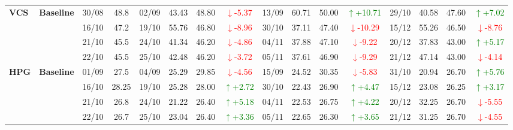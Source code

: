 \documentclass{ieeeaccess}
\begin{document}
{\begin{longtable}{llcc|cccc|cccc|cccc}
\multirow{4}{*}{\textbf{VCS}}
& \textbf{Baseline}
& 30/08 & 48.8 & 02/09 & 43.43 & 48.80 & \textcolor{red}{\(\downarrow\)-5.37} & 13/09 & 60.71 & 50.00 & \textcolor{green}{\(\uparrow\)+10.71} & 29/10 & 40.58 & 47.60 & \textcolor{green}{\(\uparrow\)+7.02} \\
& & 16/10 & 47.2 & 19/10 & 55.76 & 46.80 & \textcolor{red}{\(\downarrow\)-8.96} & 30/10 & 37.11 & 47.40 & \textcolor{red}{\(\downarrow\)-10.29} & 15/12 & 55.26 & 46.50 & \textcolor{red}{\(\downarrow\)-8.76} \\
& & 21/10 & 45.5 & 24/10 & 41.34 & 46.20 & \textcolor{red}{\(\downarrow\)-4.86} & 04/11 & 37.88 & 47.10 & \textcolor{red}{\(\downarrow\)-9.22} & 20/12 & 37.83 & 43.00 & \textcolor{green}{\(\uparrow\)+5.17} \\
& & 22/10 & 45.5 & 25/10 & 42.48 & 46.20 & \textcolor{red}{\(\downarrow\)-3.72} & 05/11 & 37.61 & 46.90 & \textcolor{red}{\(\downarrow\)-9.29} & 21/12 & 47.14 & 43.00 & \textcolor{red}{\(\downarrow\)-4.14} \\
\midrule

\multirow{4}{*}{\textbf{HPG}}
& \textbf{Baseline}
& 01/09 & 27.5 & 04/09 & 25.29 & 29.85 & \textcolor{red}{\(\downarrow\)-4.56} & 15/09 & 24.52 & 30.35 & \textcolor{red}{\(\downarrow\)-5.83} & 31/10 & 20.94 & 26.70 & \textcolor{green}{\(\uparrow\)+5.76} \\
& & 16/10 & 28.25 & 19/10 & 25.28 & 28.00 & \textcolor{green}{\(\uparrow\)+2.72} & 30/10 & 22.43 & 26.90 & \textcolor{green}{\(\uparrow\)+4.47} & 15/12 & 23.08 & 26.25 & \textcolor{green}{\(\uparrow\)+3.17} \\
& & 21/10 & 26.8 & 24/10 & 21.22 & 26.40 & \textcolor{green}{\(\uparrow\)+5.18} & 04/11 & 22.53 & 26.75 & \textcolor{green}{\(\uparrow\)+4.22} & 20/12 & 32.25 & 26.70 & \textcolor{red}{\(\downarrow\)-5.55} \\
& & 22/10 & 26.7 & 25/10 & 23.04 & 26.40 & \textcolor{green}{\(\uparrow\)+3.36} & 05/11 & 22.65 & 26.30 & \textcolor{green}{\(\uparrow\)+3.65} & 21/12 & 31.25 & 26.70 & \textcolor{red}{\(\downarrow\)-4.55} \\
\midrule


\end{longtable}}
\end{document}
